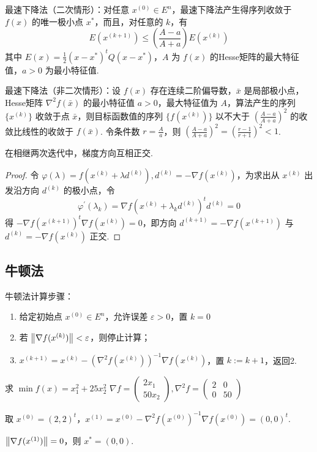\begin{remark}
    最速下降法（二次情形）：对任意 $x^{(0)} \in E^n$，最速下降法产生得序列收敛于 $f(x)$ 的唯一极小点 $x^*$，而且，对任意的 $k$，有\[E(x^{(k + 1)}) \le \left(\frac{A - a}{A + a}\right)E(x^{(k)})\] 其中 $E(x) = \frac{1}{2}(x - x^*)^tQ(x - x^*)$，$A$ 为 $f(x)$ 的Hesse矩阵的最大特征值，$a > 0$ 为最小特征值.

    最速下降法（非二次情形）：设 $f(x)$ 存在连续二阶偏导数，$\bar{x}$ 是局部极小点，Hesse矩阵 $\nabla^2f(\bar{x})$ 的最小特征值 $a > 0$，最大特征值为 $A$，算法产生的序列 $\{x^{(k)}\}$ 收敛于点 $\bar{x}$，则目标函数值的序列 $\{f(x^{(k)})\}$ 以不大于 $\left(\frac{A - a}{A + a}\right)^2$ 的收敛比线性的收敛于 $f(\bar{x})$. 令条件数 $r = \frac{A}{a}$，则 $\left(\frac{A-a}{A+a}\right)^{2}=\left(\frac{r-1}{r+1}\right)^{2}<1$.
\end{remark}

\begin{remark}
    在相继两次迭代中，梯度方向互相正交.
    \begin{proof}
        令 $\varphi(\lambda) = f(x^{(k)} + \lambda d^{(k)}), d^{(k)} = -\nabla f(x^{(k)})$，为求出从 $x^{(k)}$ 出发沿方向 $d^{(k)}$ 的极小点，令 \[\varphi^\prime(\lambda_k) = \nabla f(x^{(k)} + \lambda_kd^{(k)})^td^{(k)} = 0\] 得 $-\nabla f(x^{(k + 1)})^t\nabla f(x^{(k)}) = 0$，即方向 $d^{(k + 1)} = -\nabla f(x^{(k + 1)})$ 与 $d^{(k)} = -\nabla f(x^{(k)})$ 正交.
    \end{proof}
\end{remark}

\subsection{牛顿法}
\begin{remark}
    牛顿法计算步骤：\begin{enumerate}
        \item 给定初始点 $x^{(0)} \in E^n$，允许误差 $\varepsilon > 0$，置 $k = 0$
        \item 若 $\norm{\nabla f(x^{(k)})} < \varepsilon$，则停止计算；
        \item $x^{(k + 1)} = x^{(k)} - \left(\nabla^2f(x^{(k)})\right)^{-1}\nabla f(x^{(k)})$，置 $k:=k + 1$，返回2.
    \end{enumerate}
\end{remark}

\begin{example}
    求 $\min f(x) = x_1^2 + 25x_2^2$
    \Answer $\nabla f = \begin{pmatrix}
        2x_1\\ 50x_2
    \end{pmatrix}, \nabla^2f = \begin{pmatrix}
        2 & 0 \\ 0 & 50
    \end{pmatrix}$
    
    取 $x^{(0)} = (2, 2)^t$，$x^{(1)} = x^{(0)} - \nabla^2f(x^{(0)})^{-1}\nabla f(x^{(0)}) = (0, 0)^t$. 
    
    $\norm{\nabla f(x^{(1)})} = 0$，则 $x^* = (0, 0)$.
\end{example}


